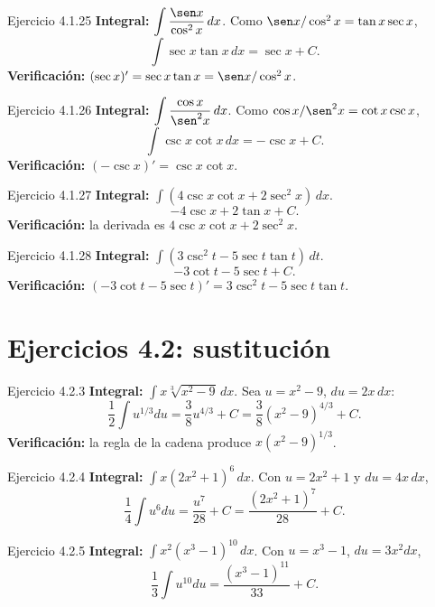 \begin{examplebox}{Ejercicio 4.1.25}
\textbf{Integral:} $\displaystyle \int\frac{\sen x}{\cos^2x}\,dx$.
Como $\sen x/\cos^2x=\tan x\sec x$,
\[
 \int\sec x\tan x\,dx=\sec x+C.
\]
\textbf{Verificación:} $(\sec x)'=\sec x\tan x=\sen x/\cos^2x$.
\end{examplebox}

\begin{examplebox}{Ejercicio 4.1.26}
\textbf{Integral:} $\displaystyle \int\frac{\cos x}{\sen^2x}\,dx$.
Como $\cos x/\sen^2x=\cot x\csc x$,
\[
 \int\csc x\cot x\,dx=-\csc x+C.
\]
\textbf{Verificación:} $(-\csc x)'=\csc x\cot x$.
\end{examplebox}

\begin{examplebox}{Ejercicio 4.1.27}
\textbf{Integral:} $\displaystyle \int(4\csc x\cot x+2\sec^2x)\,dx$.
\[
 -4\csc x+2\tan x+C.
\]
\textbf{Verificación:} la derivada es $4\csc x\cot x+2\sec^2x$.
\end{examplebox}

\begin{examplebox}{Ejercicio 4.1.28}
\textbf{Integral:} $\displaystyle \int(3\csc^2t-5\sec t\tan t)\,dt$.
\[
 -3\cot t-5\sec t+C.
\]
\textbf{Verificación:} $(-3\cot t-5\sec t)'=3\csc^2t-5\sec t\tan t$.
\end{examplebox}

\section{Ejercicios 4.2: sustitución}
\begin{examplebox}{Ejercicio 4.2.3}
\textbf{Integral:} $\displaystyle \int x\sqrt[3]{x^2-9}\,dx$.
Sea $u=x^2-9$, $du=2x\,dx$:
\[
 \frac12\int u^{1/3}du=\frac{3}{8}u^{4/3}+C
 =\frac{3}{8}(x^2-9)^{4/3}+C.
\]
\textbf{Verificación:} la regla de la cadena produce $x(x^2-9)^{1/3}$.
\end{examplebox}

\begin{examplebox}{Ejercicio 4.2.4}
\textbf{Integral:} $\displaystyle \int x(2x^2+1)^6\,dx$.
Con $u=2x^2+1$ y $du=4x\,dx$,
\[
 \frac14\int u^6du=\frac{u^7}{28}+C
 =\frac{(2x^2+1)^7}{28}+C.
\]
\end{examplebox}

\begin{examplebox}{Ejercicio 4.2.5}
\textbf{Integral:} $\displaystyle \int x^2(x^3-1)^{10}\,dx$.
Con $u=x^3-1$, $du=3x^2dx$,
\[
 \frac13\int u^{10}du=\frac{(x^3-1)^{11}}{33}+C.
\]
\end{examplebox}

